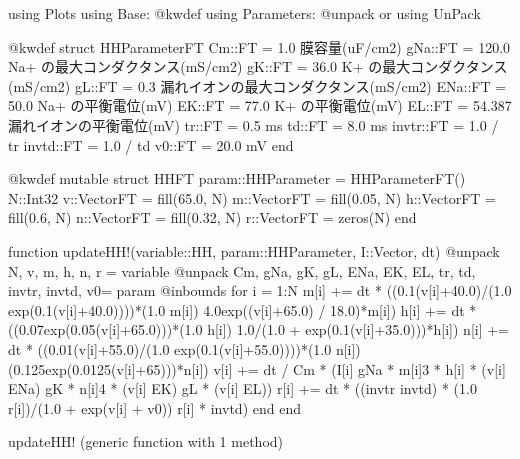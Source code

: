 \documentclass[letterpaper,10pt,english]{sphinxmanual}
\begin{document}
\begin{sphinxVerbatim}[commandchars=\\\{\}]
using Plots
using Base: @kwdef
using Parameters: @unpack \PYGZsh{} or using UnPack

@kwdef struct HHParameter\PYGZob{}FT\PYGZcb{}
    Cm::FT = 1.0 \PYGZsh{} 膜容量(uF/cm\PYGZca{}2)
    gNa::FT = 120.0 \PYGZsh{} Na+ の最大コンダクタンス(mS/cm\PYGZca{}2)
    gK::FT = 36.0 \PYGZsh{} K+ の最大コンダクタンス(mS/cm\PYGZca{}2)
    gL::FT = 0.3 \PYGZsh{} 漏れイオンの最大コンダクタンス(mS/cm\PYGZca{}2)
    ENa::FT = 50.0 \PYGZsh{} Na+ の平衡電位(mV)
    EK::FT = \PYGZhy{}77.0 \PYGZsh{} K+ の平衡電位(mV)
    EL::FT = \PYGZhy{}54.387 \PYGZsh{}漏れイオンの平衡電位(mV)
    tr::FT = 0.5 \PYGZsh{} ms
    td::FT = 8.0 \PYGZsh{} ms
    invtr::FT = 1.0 / tr
    invtd::FT = 1.0 / td
    v0::FT = \PYGZhy{}20.0 \PYGZsh{} mV
end

@kwdef mutable struct HH\PYGZob{}FT\PYGZcb{}
    param::HHParameter = HHParameter\PYGZob{}FT\PYGZcb{}()
    N::Int32
    v::Vector\PYGZob{}FT\PYGZcb{} = fill(\PYGZhy{}65.0, N)
    m::Vector\PYGZob{}FT\PYGZcb{} = fill(0.05, N)
    h::Vector\PYGZob{}FT\PYGZcb{} = fill(0.6, N)
    n::Vector\PYGZob{}FT\PYGZcb{} = fill(0.32, N)
    r::Vector\PYGZob{}FT\PYGZcb{} = zeros(N)
end

function updateHH!(variable::HH, param::HHParameter, I::Vector, dt)
    @unpack N, v, m, h, n, r = variable
    @unpack Cm, gNa, gK, gL, ENa, EK, EL, tr, td, invtr, invtd, v0= param
    @inbounds for i = 1:N
        m[i] += dt * ((0.1(v[i]+40.0)/(1.0 \PYGZhy{} exp(\PYGZhy{}0.1(v[i]+40.0))))*(1.0 \PYGZhy{} m[i]) \PYGZhy{} 4.0exp(\PYGZhy{}(v[i]+65.0) / 18.0)*m[i])
        h[i] += dt * ((0.07exp(\PYGZhy{}0.05(v[i]+65.0)))*(1.0 \PYGZhy{} h[i]) \PYGZhy{} 1.0/(1.0 + exp(\PYGZhy{}0.1(v[i]+35.0)))*h[i])
        n[i] += dt * ((0.01(v[i]+55.0)/(1.0 \PYGZhy{} exp(\PYGZhy{}0.1(v[i]+55.0))))*(1.0 \PYGZhy{} n[i]) \PYGZhy{} (0.125exp(\PYGZhy{}0.0125(v[i]+65)))*n[i])
        v[i] += dt / Cm * (I[i] \PYGZhy{} gNa * m[i]\PYGZca{}3 * h[i] * (v[i] \PYGZhy{} ENa) \PYGZhy{} gK * n[i]\PYGZca{}4 * (v[i] \PYGZhy{} EK) \PYGZhy{} gL * (v[i] \PYGZhy{} EL))
        r[i] += dt * ((invtr \PYGZhy{} invtd) * (1.0 \PYGZhy{} r[i])/(1.0 + exp(\PYGZhy{}v[i] + v0)) \PYGZhy{} r[i] * invtd)
    end
end
\end{sphinxVerbatim}

\begin{sphinxVerbatim}[commandchars=\\\{\}]
updateHH! (generic function with 1 method)
\end{sphinxVerbatim}
\end{document}
